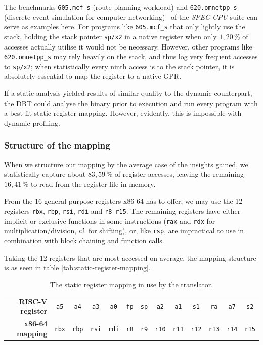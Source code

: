 The benchmarks \texttt{605.mcf\_s} (route planning workload) and \texttt{620.omnetpp\_s} (discrete event simulation for computer networking)~\cite{spec-cpu-doc} of the \textit{SPEC CPU} suite can serve as examples here.
For programs like \texttt{605.mcf\_s} that only lightly use the stack, holding the stack pointer \texttt{sp/x2} in a native register when only $1,20\,\%$ of accesses actually utilise it would not be necessary.
However, other programs like \texttt{620.omnetpp\_s} may rely heavily on the stack, and thus log very frequent accesses to \texttt{sp/x2};
when statistically every ninth access is to the stack pointer, it is absolutely essential to map the register to a native GPR.

If a static analysis yielded results of similar quality to the dynamic counterpart, the DBT could analyse the binary prior to execution and run every program with a best-fit static register mapping.
However, evidently, this is impossible with dynamic profiling.


\subsubsection{Structure of the mapping}
When we structure our mapping by the average case of the insights gained, we statistically capture about $83,59\,\%$ of register accesses, leaving the remaining $16,41\,\%$ to read from the register file in memory.

From the 16 general-purpose registers x86-64 has to offer, we may use the 12 registers \texttt{rbx}, \texttt{rbp}, \texttt{rsi}, \texttt{rdi} and \texttt{r8}--\texttt{r15}.
The remaining registers have either implicit or exclusive functions in some instructions (\texttt{rax} and \texttt{rdx} for multiplication/division, \texttt{cl} for shifting), or, like \texttt{rsp}, are impractical to use in combination with block chaining and function calls.

Taking the 12 registers that are most accessed on average, the mapping structure is as seen in table \vref{tab:static-register-mapping}.

\begin{table}
	\centering
	\begin{tabular}{rcccccccccccc}
		\toprule
		\textbf{RISC-V register} & \texttt{a5} & \texttt{a4} & \texttt{a3} & \texttt{a0} & \texttt{fp} & \texttt{sp} & \texttt{a2} & \texttt{a1} & \texttt{s1} & \texttt{ra} & \texttt{a7} & \texttt{s2}\\
		\textbf{x86-64 mapping} & \texttt{rbx} & \texttt{rbp} & \texttt{rsi} & \texttt{rdi} & \texttt{r8} & \texttt{r9} & \texttt{r10} & \texttt{r11} & \texttt{r12} & \texttt{r13} & \texttt{r14} & \texttt{r15}\\
		\bottomrule
	\end{tabular}
	\caption{The static register mapping in use by the translator.}
	\label{tab:static-register-mapping}
\end{table}


